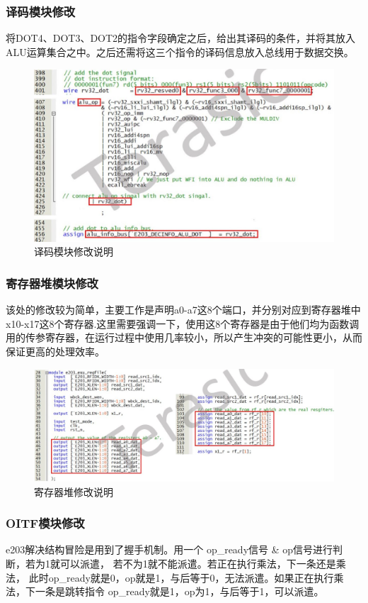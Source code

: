 \documentclass[a4paper, 14pt, oneside]{book} %
\numberwithin{equation}{subsection}
\begin{document}
	\subsubsection{译码模块修改}
	将DOT4、DOT3、DOT2的指令字段确定之后，给出其译码的条件，并将其放入ALU运算集合之中。之后还需将这三个指令的译码信息放入总线用于数据交换。
	\begin{figure}[H]
		\centering
		\includegraphics[scale=0.7]{img/decode.jpg}
		\caption{译码模块修改说明}
	\end{figure}
	
	\subsubsection{寄存器堆模块修改}
	该处的修改较为简单，主要工作是声明a0-a7这8个端口，并分别对应到寄存器堆中x10-x17这8个寄存器.这里需要强调一下，使用这8个寄存器是由于他们均为函数调用的传参寄存器，在运行过程中使用几率较小，所以产生冲突的可能性更小，从而保证更高的处理效率。
	\begin{figure}[H]
		\centering
		\includegraphics[scale=0.6]{img/register.jpg}
		\caption{寄存器堆修改说明}
	\end{figure}

	\subsubsection{OITF模块修改}
	e203解决结构冒险是用到了握手机制。用一个 op\_ready信号 \& op信号进行判断，若为1就可以派遣， 若不为1就不能派遣。若正在执行乘法，下一条还是乘法， 此时op\_ready就是0，op就是1，与后等于0，无法派遣。如果正在执行乘法，下一条是跳转指令 op\_ready就是1，op为1，与后等于1，可以派遣。
	
\end{document}
